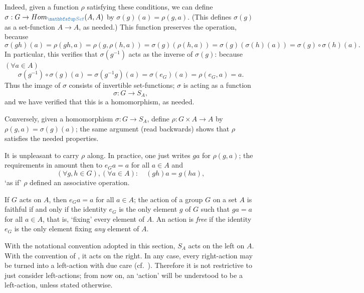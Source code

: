 Indeed, given a function $\rho$ satisfying these conditions, we can
define $\sigma : G \to \Hom_{\categ{Set}}(A,A)$ by
$\sigma(g)(a) = \rho(g,a)$. (This defines $\sigma(g)$ as a
set-function $A \to A$, as needed.) This function preserves the
operation, because
\[
  \sigma(gh)(a) = \rho(gh,a) = \rho(g,\rho(h,a)) =
  \sigma(g)(\rho(h,a)) = \sigma(g)(\sigma(h)(a)) = \sigma(g) \circ
  \sigma(h)(a).
\]
In particular, this verifies that $\sigma(g^{-1})$ acts as the inverse
of $\sigma(g)$: because $(\forall a \in A)$
\[
  \sigma(g^{-1}) \circ \sigma(g)(a) = \sigma(g^{-1}g)(a) =
  \sigma(e_G)(a) = \rho(e_G,a) = a.
\]
Thus the image of $\sigma$ consists of invertible set-functions;
$\sigma$ is acting as a function
\[
  \sigma : G \to S_A,
\]
and we have verified that this is a homomorphism, as needed.

Conversely, given a homomorphism $\sigma : G \to S_A$, define
$\rho : G \times A \to A$ by $\rho(g,a) = \sigma(g)(a)$; the same
argument (read backwards) shows that $\rho$ satisfies the needed
properties.

It is unpleasant to carry $\rho$ along. In practice, one just writes
$ga$ for $\rho(g,a)$; the requirements in
 amount then to $e_Ga = a$
for all $a \in A$ and
\[
  (\forall g, h \in G), (\forall a \in A) : \quad (gh)a = g(ha),
\]
`as if' $\rho$ defined an associative operation.

If $G$ acts on $A$, then $e_Ga = a$ for all $a \in A$; the action of a
group $G$ on a set $A$ is faithful if and only if the identity $e_G$
is the only element $g$ of $G$ such that $ga = a$ for all $a \in A$,
that is, `fixing' every element of $A$. An action is \emph{free} if
the identity $e_G$ is the only element fixing \emph{any} element of
$A$.

With the notational convention adopted in this section, $S_A$ acts on
the left on $A$. With the convention of
, it acts on the right. In any
case, every right-action may be turned into a left-action with due
care (cf.\ ). Therefore it is not
restrictive to just consider left-actions; from now on, an `action'
will be understood to be a left-action, unless stated otherwise.

